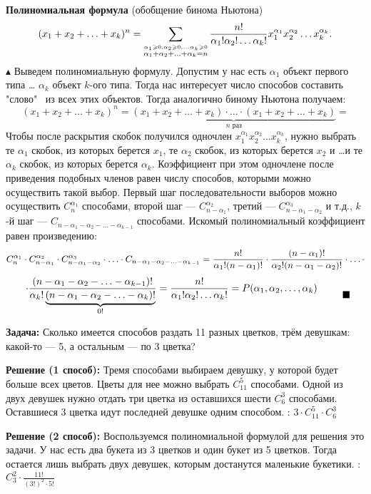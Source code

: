 \par \textbf{Полиномиальная формула} (обобщение бинома Ньютона)
\[(x_1+x_2+\ldots+x_k)^n=\sum_{\stackrel{\alpha_1\ge0,\alpha_2\ge0, \ldots\alpha_k\ge0}{\alpha_1+\alpha_2+\ldots+\alpha_k=n}}{n!\over \alpha_1!\alpha_2!\ldots\alpha_k!}x_1^{\alpha_1}x_2^{\alpha_2}\ldots x_k^{\alpha_k}.\]
$\blacktriangle$ Выведем полиномиальную формулу. Допустим у нас есть $\alpha_1$ объект первого типа \ldots \; $\alpha_k$ объект $k$-ого типа. Тогда нас интересует число способов составить "слово" \, из всех этих объектов. 
Тогда аналогично биному Ньютона получаем:
$$(x_1+x_2+\ldots+x_k)^n=\underbrace{(x_1+x_2+\ldots+x_k)\cdot\ldots\cdot(x_1+x_2+\ldots+x_k)}_{n \text{ раз}}=$$
Чтобы после раскрытия скобок получился одночлен $x_1^{\alpha_1}x_2^{\alpha_2}\ldots x_k^{\alpha_k}$, нужно выбрать те $\alpha_1$ скобок, из которых берется $x_1$, те $\alpha_2$ скобок, из которых берется $x_2$ и \ldots и те $\alpha_k$ скобок, из которых берется $\alpha_k$. Коэффициент при этом одночлене после приведения подобных членов равен числу способов, которыми можно осуществить такой выбор.
\newline Первый шаг последовательности выборов можно осуществить ${C}_n^{\alpha_1}$ способами, второй шаг — ${C}_{n-\alpha_1}^{\alpha_2}$, третий — ${C}_{n-\alpha_1-\alpha_2}^{\alpha_3}$ и т.д., $k$-й шаг — ${C}_{n-\alpha_1-\alpha_2-\ldots-\alpha_{k-1}}$ способами. Искомый полиномиальный коэффициент равен произведению:
$${C}_n^{\alpha_1}\cdot{C}_{n-\alpha_1}^{\alpha_2}\cdot{C}_{n-\alpha_1-\alpha_2}^{\alpha_3}\cdot\ldots\cdot{C}_{n-\alpha_1-\alpha_2-\ldots-\alpha_{k-1}}= {n!\over \alpha_1!(n-\alpha_1)!}\cdot{(n-\alpha_1)!\over \alpha_2!(n-\alpha_1-\alpha_2)!}\cdot\ldots\\[3mm]\cdot$$
  \[\begin{array}{l} \displaystyle \cdot{(n-\alpha_1-\alpha_2-\ldots-\alpha_{k-1})!\over \alpha_k!\underbrace{(n-\alpha_1-\alpha_2-\ldots-\alpha_k)!}_{0!}}={n!\over \alpha_1!\alpha_2!\ldots\alpha_k!} = P(\alpha_1,\alpha_2,\ldots,\alpha_k) \end{array} \qquad  \blacksquare\]

\textbf{Задача:} Сколько имеется способов раздать 11 разных цветков, трём девушкам: какой-то — 5, а остальным — по 3 цветка? 
\par \textbf{Решение (1 способ):} Тремя способами выбираем девушку, у которой будет больше всех цветов. Цветы для нее можно выбрать ${C}_{11}^5$ способами. Одной из двух девушек нужно отдать три цветка из оставшихся шести ${C}_6^3$ способами. Оставшиеся 3 цветка идут последней девушке одним способом. : $3\cdot{C}_{11}^5\cdot{C}_6^3$
\par \textbf{Решение (2 способ):} Воспользуемся полиномиальной формулой для решения это задачи. У нас есть два букета из 3 цветков и один букет из 5 цветков. Тогда остается лишь выбрать двух девушек, которым достанутся маленькие букетики. : ${C}_{3}^2\cdot \frac{11!}{(3!)^2\cdot5!}$

